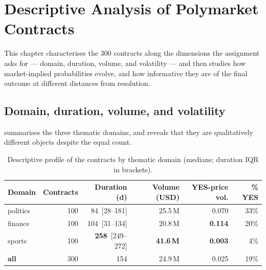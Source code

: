 
\chapter{Descriptive Analysis of Polymarket Contracts}
\label{ch:descriptive}

This chapter characterises the 300 contracts along the dimensions the assignment asks
for --- domain, duration, volume, and volatility --- and then studies how
market-implied probabilities evolve, and how informative they are of the final outcome
at different distances from resolution.

\section{Domain, duration, volume, and volatility}
 summarises the three thematic domains, and reveals that they are
qualitatively different objects despite the equal count.

\begin{table}[H]
\centering
\caption{Descriptive profile of the contracts by thematic domain
(medians; duration IQR in brackets).}
\label{tab:descriptive}
\small
\begin{tabular}{@{}l r r r r r@{}}
\toprule
\textbf{Domain} & \textbf{Contracts} & \textbf{Duration (d)} & \textbf{Volume (USD)} &
\textbf{YES-price vol.} & \textbf{\% YES}\\
\midrule
politics & 100 & 84 \,[28--181] & 25.5\,M & 0.070 & 33\%\\
finance  & 100 & 104 \,[31--134] & 20.8\,M & \textbf{0.114} & 20\%\\
sports   & 100 & \textbf{258} \,[249--272] & \textbf{41.6\,M} & \textbf{0.003} & 4\%\\
\midrule
\textbf{all} & 300 & 154 & 24.9\,M & 0.025 & 19\%\\
\bottomrule
\end{tabular}
\end{table}

